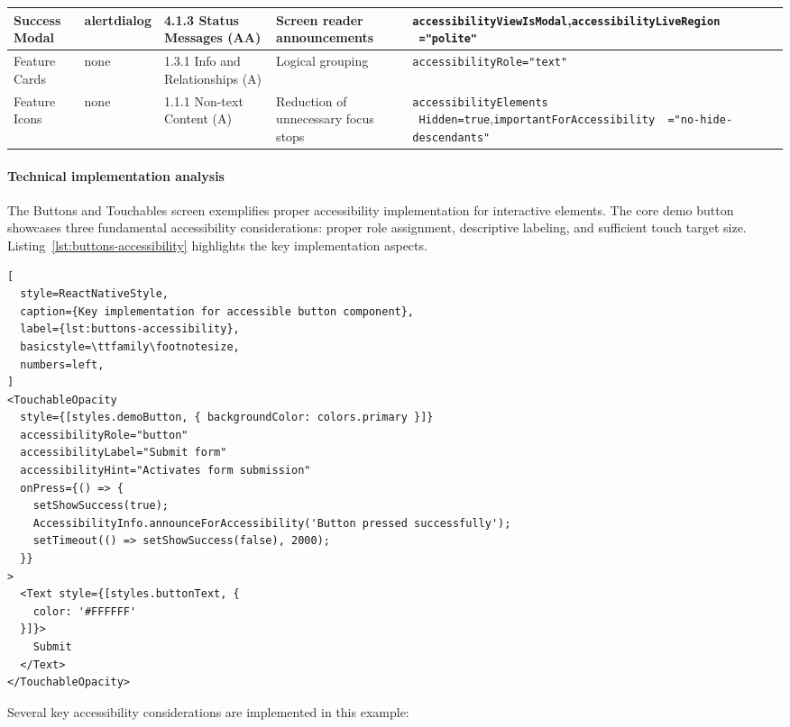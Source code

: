 \begin{longtable}[c]{|P{2.5cm}|P{2cm}|P{2.8cm}|P{2.8cm}|P{5.4cm}|}
\hline
Success Modal & alertdialog & 4.1.3 Status Messages (AA) & Screen reader announcements & \texttt{accessibilityViewIsModal},\newline \texttt{accessibilityLiveRegion \ ="polite"} \\
\hline
Feature Cards & none & 1.3.1 Info and Relationships (A) & Logical grouping & \texttt{accessibilityRole="text"} \\
\hline
Feature Icons & none & 1.1.1 Non-text Content (A) & Reduction of unnecessary focus stops & \texttt{accessibilityElements \ Hidden=true},\newline \texttt{importantForAccessibility \ ="no-hide-descendants"} \\
\end{longtable}

\paragraph{Technical implementation analysis}

The Buttons and Touchables screen exemplifies proper accessibility implementation for interactive elements. The core demo button showcases three fundamental accessibility considerations: proper role assignment, descriptive labeling, and sufficient touch target size. Listing~\ref{lst:buttons-accessibility} highlights the key implementation aspects.

\begin{lstlisting}[
  style=ReactNativeStyle,
  caption={Key implementation for accessible button component},
  label={lst:buttons-accessibility},
  basicstyle=\ttfamily\footnotesize,
  numbers=left,
]
<TouchableOpacity
  style={[styles.demoButton, { backgroundColor: colors.primary }]}
  accessibilityRole="button"
  accessibilityLabel="Submit form"
  accessibilityHint="Activates form submission"
  onPress={() => {
    setShowSuccess(true);
    AccessibilityInfo.announceForAccessibility('Button pressed successfully');
    setTimeout(() => setShowSuccess(false), 2000);
  }}
>
  <Text style={[styles.buttonText, {
    color: '#FFFFFF'
  }]}>
    Submit
  </Text>
</TouchableOpacity>
\end{lstlisting}

Several key accessibility considerations are implemented in this example:


